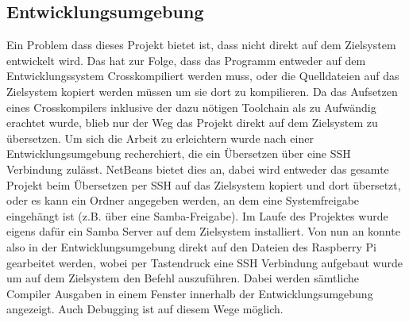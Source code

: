 \subsection{Entwicklungsumgebung}
Ein Problem dass dieses Projekt bietet ist, dass nicht direkt auf dem Zielsystem entwickelt wird. Das hat zur Folge, dass das Programm entweder auf dem Entwicklungssystem Crosskompiliert werden muss, oder die Quelldateien auf das Zielsystem kopiert werden müssen um sie dort zu kompilieren. Da das Aufsetzen eines Crosskompilers inklusive der dazu nötigen Toolchain als zu Aufwändig erachtet wurde, blieb nur der Weg das Projekt direkt auf dem Zielsystem zu übersetzen. Um sich die Arbeit zu erleichtern wurde nach einer Entwicklungsumgebung recherchiert, die ein Übersetzen über eine SSH Verbindung zulässt. NetBeans bietet dies an, dabei wird entweder das gesamte Projekt beim Übersetzen per SSH auf das Zielsystem kopiert und dort übersetzt, oder es kann ein Ordner angegeben werden, an dem eine Systemfreigabe eingehängt ist (z.B. über eine Samba-Freigabe). Im Laufe des Projektes wurde eigens dafür ein Samba Server auf dem Zielsystem installiert. Von nun an konnte also in der Entwicklungsumgebung direkt auf den Dateien des Raspberry Pi gearbeitet werden, wobei per Tastendruck eine SSH Verbindung aufgebaut wurde um auf dem Zielsystem den Befehl  auszuführen. Dabei werden sämtliche Compiler Ausgaben in einem Fenster innerhalb der Entwicklungsumgebung angezeigt. Auch Debugging ist auf diesem Wege möglich.


